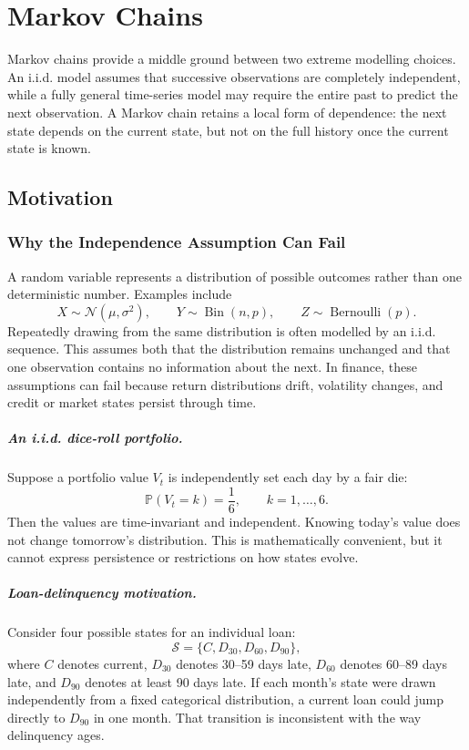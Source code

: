 \documentclass[12pt,openany]{book}
\theoremstyle{definition}
\theoremstyle{remark}
\begin{document}
\chapter{Markov Chains}

Markov chains provide a middle ground between two extreme modelling choices.
An i.i.d. model assumes that successive observations are completely
independent, while a fully general time-series model may require the entire
past to predict the next observation. A Markov chain retains a local form of
dependence: the next state depends on the current state, but not on the full
history once the current state is known.

\section{Motivation}

\subsection{Why the Independence Assumption Can Fail}

A random variable represents a distribution of possible outcomes rather than
one deterministic number. Examples include
\[
X\sim\mathcal{N}(\mu,\sigma^2),
\qquad
Y\sim\operatorname{Bin}(n,p),
\qquad
Z\sim\operatorname{Bernoulli}(p).
\]
Repeatedly drawing from the same distribution is often modelled by an i.i.d.
sequence. This assumes both that the distribution remains unchanged and that
one observation contains no information about the next. In finance, these
assumptions can fail because return distributions drift, volatility changes,
and credit or market states persist through time.

\paragraph{An i.i.d. dice-roll portfolio.}
Suppose a portfolio value \(V_t\) is independently set each day by a fair die:
\[
\mathbb{P}(V_t=k)=\frac16,
\qquad k=1,\ldots,6.
\]
Then the values are time-invariant and independent. Knowing today's value
does not change tomorrow's distribution. This is mathematically convenient,
but it cannot express persistence or restrictions on how states evolve.

\paragraph{Loan-delinquency motivation.}
Consider four possible states for an individual loan:
\[
\mathcal{S}
=\{C,D_{30},D_{60},D_{90}\},
\]
where \(C\) denotes current, \(D_{30}\) denotes 30--59 days late,
\(D_{60}\) denotes 60--89 days late, and \(D_{90}\) denotes at least 90 days
late. If each month's state were drawn independently from a fixed categorical
distribution, a current loan could jump directly to \(D_{90}\) in one month.
That transition is inconsistent with the way delinquency ages.
\end{document}
